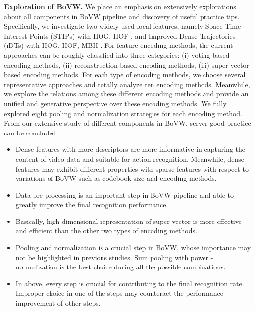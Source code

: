 \documentclass[twocolumn]{svjour3}          \smartqed  \usepackage{slashbox}
\begin{document}
\textbf{Exploration of BoVW.} We place an emphasis on extensively explorations about all components in BoVW pipeline and discovery of useful practice tips. Specifically, we investigate two widely-used local features, namely Space Time Interest Points (STIPs) with HOG, HOF \cite{Laptev05}, and Improved Dense Trajectories (iDTs) with HOG, HOF, MBH \cite{WangS13a}. For feature encoding methods, the current approaches can be roughly classified into three categories: (i) voting based encoding methods, (ii) reconstruction based encoding methods, (iii) super vector based encoding methods. For each type of encoding methods, we choose several representative approaches and totally analyze ten encoding methods. Meanwhile, we explore the relations among these different encoding methods and provide an unified and generative perspective over these encoding methods. We fully explored eight pooling and normalization strategies for each encoding method. From our extensive study of different components in BoVW, server good practice can be concluded:
\begin{itemize}
  \item Dense features with more descriptors are more informative in capturing the content of video data and suitable for action recognition. Meanwhile, dense features may exhibit different properties with sparse features with respect to variations of BoVW such as codebook size and encoding methods.
  \item Data pre-processing is an important step in BoVW pipeline and able to greatly improve the final recognition performance.
  \item Basically, high dimensional representation of super vector is more effective and efficient than the other two types of encoding methods.
  \item Pooling and normalization is a crucial step in BoVW, whose importance may not be highlighted in previous studies. Sum pooling with power -normalization is the best choice during all the possible combinations.
  \item In above, every step is crucial for contributing to the final recognition rate. Improper choice in one of the steps may counteract the performance improvement of other steps.
\end{itemize}
\end{document}
